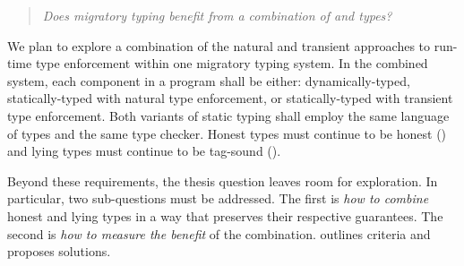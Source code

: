 

\begin{quote}
  \emph{Does migratory typing benefit from a combination of \tdeep{} and \tshallow{} types?}
\end{quote}

We plan to explore a combination of the natural and transient approaches to
 run-time type enforcement within one migratory typing system.
In the combined system, each component in a program shall be either:
 dynamically-typed,
 statically-typed with natural type enforcement,
 or statically-typed with transient type enforcement.
Both variants of static typing shall employ the same language of types and the
 same type checker.
Honest types must continue to be honest ()
 and lying types must continue to be tag-sound ().

Beyond these requirements, the thesis question leaves room for exploration.
In particular, two sub-questions must be addressed.
The first is \emph{how to combine}\/ honest and lying
 types in a way that preserves their respective guarantees.
The second is \emph{how to measure the benefit}\/ of the combination.
 outlines criteria and proposes solutions.

